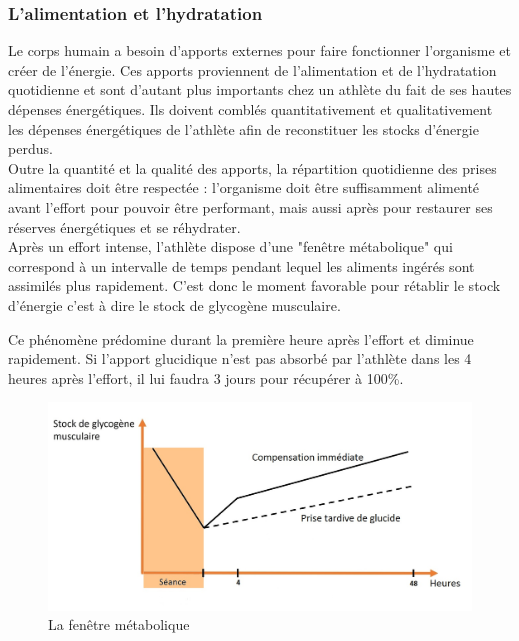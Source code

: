             
                \subsubsection{L'alimentation et l’hydratation}
                
                    Le corps humain a besoin d’apports externes pour faire fonctionner l’organisme et créer de l’énergie. Ces apports proviennent de l'alimentation et de l'hydratation quotidienne et sont d'autant plus importants chez un athlète du fait de ses hautes dépenses énergétiques.
                    Ils doivent comblés quantitativement et qualitativement les dépenses énergétiques de l'athlète afin de reconstituer les stocks d'énergie perdus.\\
                    
                    Outre la quantité et la qualité des apports, la répartition quotidienne des prises alimentaires doit être respectée : l’organisme doit être suffisamment alimenté avant l'effort pour pouvoir être performant, mais aussi après pour restaurer ses réserves énergétiques et se réhydrater.\\
                    
                    Après un effort intense, l'athlète dispose d'une "fenêtre métabolique" qui correspond à un intervalle de temps pendant lequel les aliments ingérés sont assimilés plus rapidement. C'est donc le moment favorable pour rétablir le stock d'énergie c'est à dire le stock de glycogène musculaire. 
                    
                    Ce phénomène prédomine durant la première heure après l’effort et diminue rapidement. Si l'apport glucidique n'est pas absorbé par l'athlète dans les 4 heures après l'effort, il lui faudra 3 jours pour récupérer à 100\%.
                    
                    \begin{figure}[H]
                        \centering
                        \includegraphics[scale=1]{images/fenetre-metabolique.jpg}
                        \caption{\label{fig:filieres-energetiques}La fenêtre métabolique}
                    \end{figure}
                    
